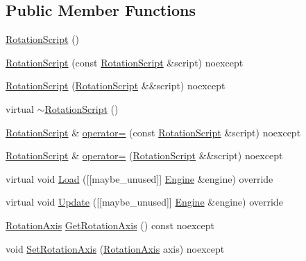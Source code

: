 \subsection*{Public Member Functions}
\begin{DoxyCompactItemize}
\item 
\mbox{\hyperlink{classmage_1_1script_1_1_rotation_script_a2961e96c890f5b737fa1851a4f6434fe}{Rotation\+Script}} ()
\item 
\mbox{\hyperlink{classmage_1_1script_1_1_rotation_script_adac08b8383fabba67df915f03a2a01ee}{Rotation\+Script}} (const \mbox{\hyperlink{classmage_1_1script_1_1_rotation_script}{Rotation\+Script}} \&script) noexcept
\item 
\mbox{\hyperlink{classmage_1_1script_1_1_rotation_script_a56942de038a4899fa2fb3d9199f18052}{Rotation\+Script}} (\mbox{\hyperlink{classmage_1_1script_1_1_rotation_script}{Rotation\+Script}} \&\&script) noexcept
\item 
virtual \mbox{\hyperlink{classmage_1_1script_1_1_rotation_script_a7deb74070c49b78b0b91e3599ee8a0b7}{$\sim$\+Rotation\+Script}} ()
\item 
\mbox{\hyperlink{classmage_1_1script_1_1_rotation_script}{Rotation\+Script}} \& \mbox{\hyperlink{classmage_1_1script_1_1_rotation_script_a9302878671d095bab0c31a379ad7d964}{operator=}} (const \mbox{\hyperlink{classmage_1_1script_1_1_rotation_script}{Rotation\+Script}} \&script) noexcept
\item 
\mbox{\hyperlink{classmage_1_1script_1_1_rotation_script}{Rotation\+Script}} \& \mbox{\hyperlink{classmage_1_1script_1_1_rotation_script_af75323393f7570b9fcee0cd62c4f76bd}{operator=}} (\mbox{\hyperlink{classmage_1_1script_1_1_rotation_script}{Rotation\+Script}} \&\&script) noexcept
\item 
virtual void \mbox{\hyperlink{classmage_1_1script_1_1_rotation_script_a7da4165e899facc981c0ee5b1f4a4453}{Load}} (\mbox{[}\mbox{[}maybe\+\_\+unused\mbox{]}\mbox{]} \mbox{\hyperlink{classmage_1_1_engine}{Engine}} \&engine) override
\item 
virtual void \mbox{\hyperlink{classmage_1_1script_1_1_rotation_script_af4e83590b78094186b0dd107a58c7b3a}{Update}} (\mbox{[}\mbox{[}maybe\+\_\+unused\mbox{]}\mbox{]} \mbox{\hyperlink{classmage_1_1_engine}{Engine}} \&engine) override
\item 
\mbox{\hyperlink{classmage_1_1script_1_1_rotation_script_a54e1d1d0af65f43f5bc5ad65a4b9c00a}{Rotation\+Axis}} \mbox{\hyperlink{classmage_1_1script_1_1_rotation_script_ac2ef46249d59b379f47336eb250f3a28}{Get\+Rotation\+Axis}} () const noexcept
\item 
void \mbox{\hyperlink{classmage_1_1script_1_1_rotation_script_aa4b49dc5e34da3e851d5aefc4c4a434b}{Set\+Rotation\+Axis}} (\mbox{\hyperlink{classmage_1_1script_1_1_rotation_script_a54e1d1d0af65f43f5bc5ad65a4b9c00a}{Rotation\+Axis}} axis) noexcept
\end{DoxyCompactItemize}
